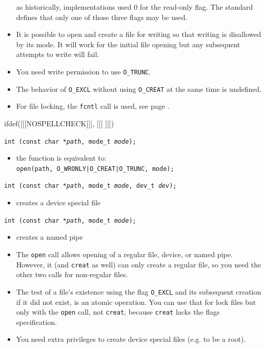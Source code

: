 \begin{itemize}
as historically, implementations used 0 for the read-only flag.  The standard
defines that only one of those three flags may be used.
\item It is possible to open and create a file for writing so that writing is
disallowed by its mode.  It will work for the initial file opening but any
subsequent attempts to write will fail.
\item You need write permission to use \texttt{O\_TRUNC}.
\item The behavior of \texttt{O\_EXCL} without using \texttt{O\_CREAT} at the
same time is undefined.
\item For file locking, the \texttt{fcntl} call is used, see page
\pageref{FCNTL}.
\end{itemize}


ifdef([[[NOSPELLCHECK]]], [[[
]]])

\begin{slide}
\texttt{int (const char *\emph{path}, mode\_t \emph{mode});}
\begin{itemize}
\item the function is equivalent to:\\
\texttt{open(path, O\_WRONLY|O\_CREAT|O\_TRUNC, mode);}
\end{itemize}
\texttt{int (const char *\emph{path}, mode\_t \emph{mode},
dev\_t \emph{dev});}
\begin{itemize}
\item creates a device special file
\end{itemize}
\texttt{int (const char *\emph{path}, mode\_t \emph{mode});} 
\begin{itemize}
\item creates a named pipe
\end{itemize}
\end{slide}


\begin{itemize}
\item The \texttt{open} call allows opening of a regular file, device, or named
pipe.  However, it (and \texttt{creat} as well) can only create a regular file,
so you need the other two calls for non-regular files.
\item The test of a file's existence using the flag \texttt{O\_EXCL} and its
subsequent creation if it did not exist, is an atomic operation.  You can use
that for lock files but only with the \texttt{open} call, not \texttt{creat},
because \texttt{creat} lacks the flags specification.
\item You need extra privileges to create device special files (e.g. to be a
root).
\end{itemize}

